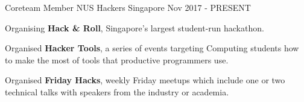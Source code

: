 

\begin{cventries}

  \cventry
  {Coreteam Member} %
  {NUS Hackers} %
  {Singapore} %
  {Nov 2017 - PRESENT} %
  {
    \begin{cvitems} %
      \item {Organising \textbf{Hack \& Roll}, Singapore's largest student-run hackathon.}
      \item {Organised \textbf{Hacker Tools}, a series of events targeting Computing students how to make the most of tools that productive programmers use.}
      \item {Organised \textbf{Friday Hacks}, weekly Friday meetups which include one or two technical talks with speakers from the industry or academia.}
    \end{cvitems}
  }


\end{cventries}

